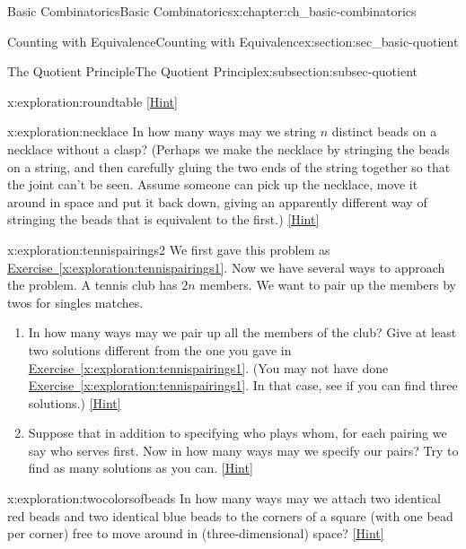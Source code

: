 \documentclass[oneside,10pt,]{book}
\numberwithin{equation}{chapter}
\begin{document}
\begin{chapterptx}{Basic Combinatorics}{}{Basic Combinatorics}{}{}{x:chapter:ch_basic-combinatorics}
\begin{sectionptx}{Counting with Equivalence}{}{Counting with Equivalence}{}{}{x:section:sec_basic-quotient}
\begin{subsectionptx}{The Quotient Principle}{}{The Quotient Principle}{}{}{x:subsection:subsec-quotient}
\begin{exploration}{}{x:exploration:roundtable}
\space\hspace*{0pt}\hfill{\tiny\hyperlink{g:hint:idm1850-back}{[Hint]}}\end{exploration}
\begin{exploration}{}{x:exploration:necklace}%
In how many ways may we string \(n\) distinct beads on a necklace without a clasp? (Perhaps we make the necklace by stringing the beads on a string, and then carefully gluing the two ends of the string together so that the joint can't be seen. Assume someone can pick up the necklace, move it around in space and put it back down, giving an apparently different way of stringing the beads that is equivalent to the first.)%
\space\hspace*{0pt}\hfill{\tiny\hyperlink{g:hint:idm1871-back}{[Hint]}}\end{exploration}
\begin{exploration}{}{x:exploration:tennispairings2}%
We first gave this problem as \hyperref[x:exploration:tennispairings1]{Exercise~\ref{x:exploration:tennispairings1}}. Now we have several ways to approach the problem. A tennis club has \(2n\) members. We want to pair up the members by twos for singles matches.%
\begin{enumerate}[font=\bfseries,label=(\alph*),ref=\alph*]
\item{}In how many ways may we pair up all the members of the club? Give at least two solutions different from the one you gave in   \hyperref[x:exploration:tennispairings1]{Exercise~\ref{x:exploration:tennispairings1}}. (You may not have done \hyperref[x:exploration:tennispairings1]{Exercise~\ref{x:exploration:tennispairings1}}. In that case, see if you can find three solutions.)%
\space\hspace*{0pt}\hfill{\tiny\hyperlink{g:hint:idm1897-back}{[Hint]}}\item{}Suppose that in addition to specifying who plays whom, for each pairing we say who serves first.  Now in how many ways may we specify our pairs? Try to find as many solutions as you can.%
\space\hspace*{0pt}\hfill{\tiny\hyperlink{g:hint:idm1923-back}{[Hint]}}\end{enumerate}
\end{exploration}
\begin{exploration}{}{x:exploration:twocolorsofbeads}%
In how many ways may we attach two identical red beads and two identical blue beads to the corners of a square (with one bead per corner) free to move around in (three-dimensional) space?%
\space\hspace*{0pt}\hfill{\tiny\hyperlink{g:hint:idm1946-back}{[Hint]}}\end{exploration}

\end{subsectionptx}
\end{sectionptx}
\end{chapterptx}
\end{document}
